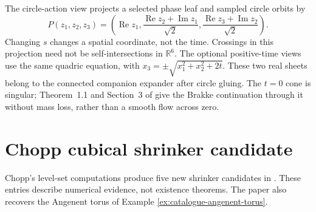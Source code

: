 \begin{example}
The circle-action view projects a selected phase leaf and sampled circle orbits by
\[
 P(z_1,z_2,z_3)=\left(\operatorname{Re}z_1,
 \frac{\operatorname{Re}z_2+\operatorname{Im}z_1}{\sqrt2},
 \frac{\operatorname{Re}z_3+\operatorname{Im}z_2}{\sqrt2}\right).
\]
Changing $s$ changes a spatial coordinate, not the time. Crossings in this projection need not be self-intersections in $\mathbb R^6$.
The optional positive-time views use the same quadric equation, with
$x_3=\pm\sqrt{x_1^2+x_2^2+2t}$. These two real sheets belong to the connected companion expander after circle gluing. The $t=0$ cone is singular; Theorem~1.1 and Section~3 of \cite{CatLeeWang2010} give the Brakke continuation through it without mass loss, rather than a smooth flow across zero.
\end{example}

\chapter{Chopp cubical shrinker candidate}\label{sec:catalogue-chopp-cube}
Chopp's level-set computations produce five new shrinker candidates in
\cite{CatChopp1994}. These entries describe numerical evidence, not existence
theorems. The paper also recovers the Angenent torus of
Example \ref{ex:catalogue-angenent-torus}.


